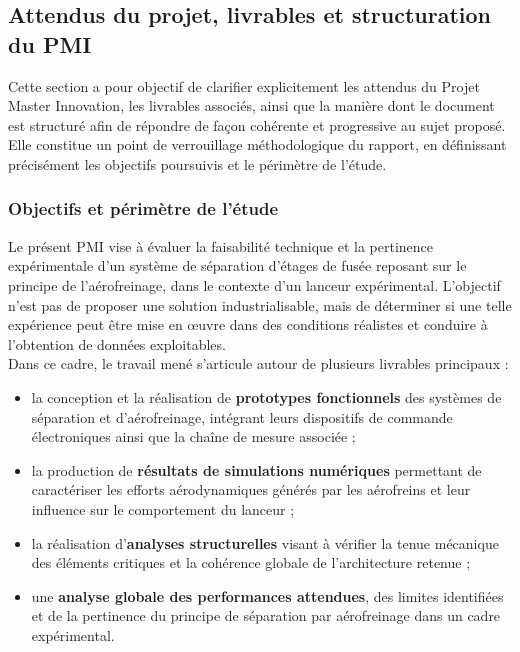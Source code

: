\subsection{Attendus du projet, livrables et structuration du PMI}

Cette section a pour objectif de clarifier explicitement les attendus du Projet Master Innovation, les livrables associés, ainsi
que la manière dont le document est structuré afin de répondre de façon cohérente et progressive au sujet proposé. Elle
constitue un point de verrouillage méthodologique du rapport, en définissant précisément les objectifs poursuivis et le
périmètre de l’étude.

\subsubsection{Objectifs et périmètre de l’étude}

Le présent \acrshort{PMI} vise à évaluer la faisabilité technique et la pertinence expérimentale d’un système de séparation
d’étages de fusée reposant sur le principe de l’aérofreinage, dans le contexte d’un lanceur expérimental. L’objectif n’est pas
de proposer une solution industrialisable, mais de déterminer si une telle expérience peut être mise en œuvre dans des conditions
réalistes et conduire à l’obtention de données exploitables.\\

Dans ce cadre, le travail mené s’articule autour de plusieurs livrables principaux :
\begin{itemize}
    \item la conception et la réalisation de \textbf{prototypes fonctionnels} des systèmes de séparation et d’aérofreinage,
    intégrant leurs dispositifs de commande électroniques ainsi que la chaîne de mesure associée ;
    \item la production de \textbf{résultats de simulations numériques} permettant de caractériser les efforts
    aérodynamiques générés par les aérofreins et leur influence sur le comportement du lanceur ;
    \item la réalisation d’\textbf{analyses structurelles} visant à vérifier la tenue mécanique des éléments critiques et la
    cohérence globale de l’architecture retenue ;
    \item une \textbf{analyse globale des performances attendues}, des limites identifiées et de la pertinence du principe de
    séparation par aérofreinage dans un cadre expérimental.\\
\end{itemize}

